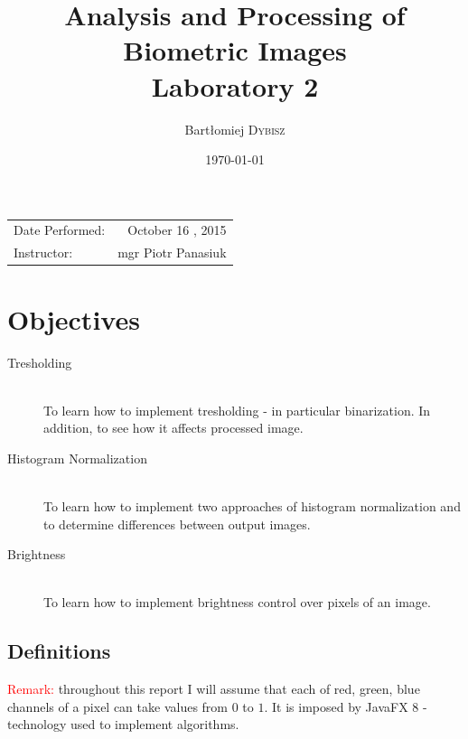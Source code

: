 \documentclass{article}
\title{Analysis and Processing of Biometric Images \\ Laboratory 2} %
\author{Bartłomiej \textsc{Dybisz}} %
\date{\today} %
\begin{document}
\maketitle %

\begin{center}
\begin{tabular}{l r}
Date Performed: & October 16 , 2015 \\ %
Instructor: & mgr Piotr Panasiuk %
\end{tabular}
\end{center}



\section{Objectives}

\begin{description}
\item[Tresholding] \hfill \\
To learn how to implement tresholding - in particular binarization. In addition, to see how it affects processed image.
\item[Histogram Normalization] \hfill \\
To learn how to implement two approaches of histogram normalization and to determine differences between output images.
\item[Brightness] \hfill \\
To learn how to implement brightness control over pixels of an image. 
\end{description}

\subsection{Definitions}
\label{definitions}
\textcolor{red}{Remark:} throughout this report I will assume that each of red, green, blue channels of a pixel can take values from $0$ to $1$. It is imposed by JavaFX 8 - technology used to implement algorithms.
\end{document}
